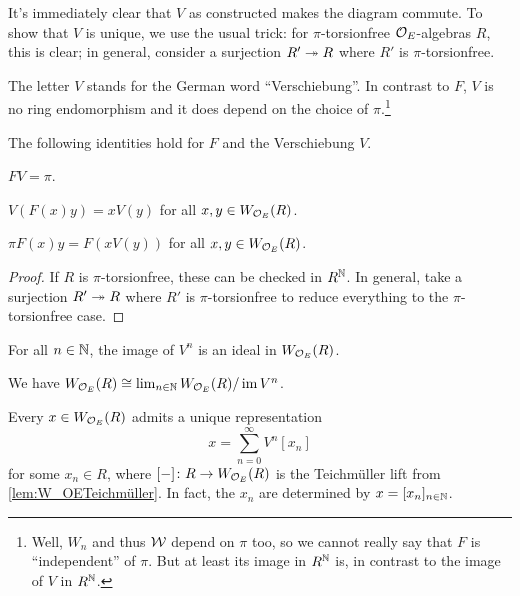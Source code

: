 \begin{proof*}
	It's immediately clear that $V$ as constructed makes the diagram commute. To show that $V$ is unique, we use the usual trick: for $\pi$-torsionfree $\mathcal{O}_E$-algebras $R$, this is clear; in general, consider a surjection $R'\epimorphism R$ where $R'$ is $\pi$-torsionfree.
\end{proof*}
The letter $V$ stands for the German word \enquote{Verschiebung}. In contrast to $F$, $V$ is no ring endomorphism and it does depend on the choice of $\pi$.\footnote{Well, $W_n$ and thus $\mathcal{W}$ depend on $\pi$ too, so we cannot really say that $F$ is \enquote{independent} of $\pi$. But at least its image in $R^{\mathbb{N}}$ is, in contrast to the image of $V$ in $R^{\mathbb{N}}$.}
\begin{lem}\label{lem:FVidentities}
	The following identities hold for $F$ and the Verschiebung $V$.
	\begin{numerate}
		\item $FV=\pi$.
		\item $V(F(x)y)=xV(y)$ for all $x,y\in W_{\mathcal{O}_E}(R)$.
		\item $\pi F(x)y=F(xV(y))$ for all $x,y\in W_{\mathcal{O}_E}(R)$. 
	\end{numerate}
\end{lem}
\begin{proof}
	If $R$ is $\pi$-torsionfree, these can be checked in $R^{\mathbb{N}}$. In general, take a surjection $R'\epimorphism R$ where $R'$ is $\pi$-torsionfree to reduce everything to the $\pi$-torsionfree case.
\end{proof}
\begin{lem}\label{lem:imVn}
	\begin{numerate}
		\item For all $n\in\mathbb{N}$, the image of $V^n$ is an ideal in $W_{\mathcal{O}_E}(R)$.
		\item We have $W_{\mathcal{O}_E}(R)\cong \lim_{n\in\mathbb{N}}W_{\mathcal{O}_E}(R)/\operatorname{im} V^n$.
		\item Every $x\in W_{\mathcal{O}_E}(R)$ admits a unique representation
		\begin{equation*}
			x=\sum_{n=0}^\infty V^n[x_n]
		\end{equation*}
		for some $x_n\in R$, where $[-]\colon R\morphism W_{\Oo_E}(R)$ is the Teichmüller lift from \cref{lem:W_OETeichmüller}. In fact, the $x_n$ are determined by $x=[x_n]_{n\in\mathbb{N}}$.
	\end{numerate}
\end{lem}
